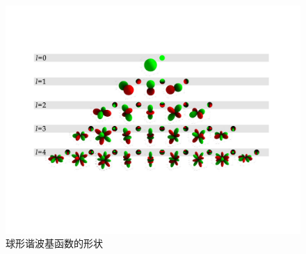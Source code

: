 \begin{figure}[!htbp]
    \centering
    \includegraphics[width=1.0\textwidth]{Img/sh-shape.pdf}

    \caption[球形谐波基函数的形状]{ 
        球形谐波基函数的形状
        \label{fig:sh-shape}
        \cite{green2003spherical}
    }
\end{figure}